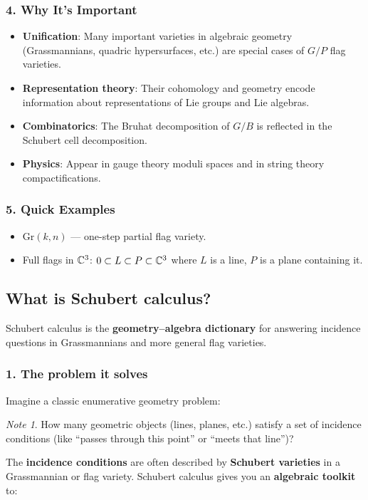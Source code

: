\documentclass{amsart}
\let\originalmathbb\mathbb
\renewcommand{\mathbb}[1]{%
    \ifstrequal{#1}{1}{\mathbbm{#1}}{\originalmathbb{#1}}%
}
\theoremstyle{plain}
\theoremstyle{definition}
\theoremstyle{remark}
\newtheorem{note}[theorem]{Note}
\begin{document}
\subsubsection{4. Why It’s Important}

\begin{itemize}
	\item \textbf{Unification}: Many important varieties in algebraic geometry (Grassmannians, quadric hypersurfaces, etc.) are special cases of $G/P$ flag varieties.
	\item \textbf{Representation theory}: Their cohomology and geometry encode information about representations of Lie groups and Lie algebras.
	\item \textbf{Combinatorics}: The Bruhat decomposition of $G/B$ is reflected in the Schubert cell decomposition.
	\item \textbf{Physics}: Appear in gauge theory moduli spaces and in string theory compactifications.
\end{itemize}

\subsubsection{5. Quick Examples}

\begin{itemize}
	\item $\mathrm{Gr}(k,n)$ — one-step partial flag variety.
	\item Full flags in $\mathbb{C}^3$: $0 \subset L \subset P \subset \mathbb{C}^3$
where $L$ is a line, $P$ is a plane containing it.
\end{itemize}

\subsection{What is Schubert calculus?}

Schubert calculus is the \textbf{geometry–algebra dictionary} for answering incidence questions in Grassmannians and more general flag varieties.

\subsubsection{1. \textbf{The problem it solves}}

Imagine a classic enumerative geometry problem:

\begin{note}
How many geometric objects (lines, planes, etc.) satisfy a set of incidence conditions (like “passes through this point” or “meets that line”)?
\end{note}
The \textbf{incidence conditions} are often described by \textbf{Schubert varieties} in a Grassmannian or flag variety.
Schubert calculus gives you an \textbf{algebraic toolkit} to:
\end{document}
